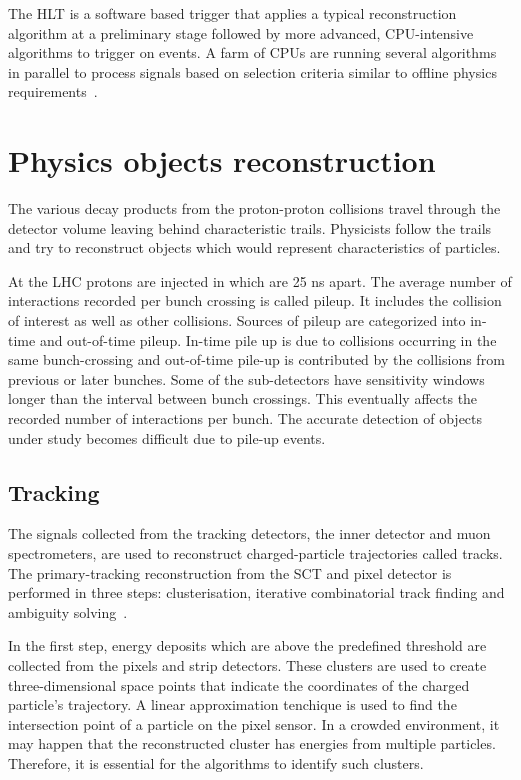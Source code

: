 The HLT is a software based trigger that applies a typical reconstruction algorithm at a preliminary stage 
followed by more advanced, CPU-intensive algorithms to trigger on events. A farm of CPUs are running several
algorithms in parallel to process signals based on selection criteria similar to offline physics requirements~\cite{C-Gabaldon_2012}.   



\section{Physics objects reconstruction}

The various decay products from the proton-proton collisions travel through the detector volume leaving
behind characteristic trails. Physicists follow the trails and try to reconstruct objects which would represent
characteristics of particles.

At the LHC protons are injected in  which are 25 ns apart. The average number of interactions
recorded per bunch crossing is called pileup. It includes the collision of interest as well as other collisions.
Sources of pileup are categorized into in-time and out-of-time pileup. In-time pile up is due to collisions
occurring in the same bunch-crossing and out-of-time pile-up is contributed by the collisions from previous
or later bunches. Some of the sub-detectors have sensitivity windows longer than the interval between
bunch crossings. This eventually affects the recorded number of interactions per bunch. The accurate
detection of objects under study becomes difficult due to pile-up events.


\subsection{Tracking}
The signals collected from the tracking detectors, the inner detector and muon spectrometers, are used to reconstruct charged-particle trajectories called tracks. The primary-tracking
reconstruction from the SCT and pixel detector is performed in three steps: clusterisation, iterative combinatorial track finding and ambiguity solving~\cite{Aaboud_2017}. 

In the first step, energy deposits which are above the predefined threshold are collected from the pixels and strip detectors. These clusters are used to create
three-dimensional space points that indicate the coordinates of the charged particle's trajectory. A linear approximation tenchique is used to find the intersection
point of a particle on the pixel sensor. In a crowded environment, it may happen that the reconstructed cluster has energies from multiple particles. Therefore,
it is essential for the algorithms to identify such clusters. 


